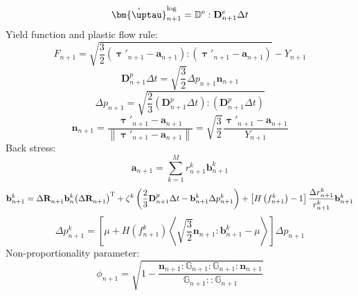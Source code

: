 \begin{equation}
\label{Equ:sigman+1}
\mathring {\bm{\uptau}}_{n + 1}^{\log } = {\mathbb{D}^{\rm{e}}}:{\mathbf{D}}_{n + 1}^e\Delta t
\end{equation}
Yield function and plastic flow rule:
\begin{equation}
\label{Equ:Fn+1}
{F_{n + 1}} = \sqrt {\frac{3}{2}\left( {{{\bm{\uptau}}'_{n + 1}} - {{\mathbf{a}}_{n + 1}}} \right):\left( {{{\bm{\uptau}}'_{n + 1}} - {{\mathbf{a}}_{n + 1}}} \right)}  - {Y_{n + 1}}
\end{equation}
\begin{equation}
\label{Equ:epsilonpn+1}
{\mathbf{D}}_{n + 1}^p\Delta t = \sqrt {\frac{3}{2}} \Delta {p_{n + 1}}{{\mathbf{n}}_{n + 1}}
\end{equation}
\begin{equation}
\label{Equ:pn+1}
\Delta {p_{n + 1}} = \sqrt {\frac{2}{3} \left({\mathbf{D}}_{n + 1}^p\Delta t\right):\left({\mathbf{D}}_{n + 1}^p\Delta t\right)}
\end{equation}
\begin{equation}
\label{Equ:nn+1}
{{\mathbf{n}}_{n + 1}} = \frac{{{{\bm{\uptau}'}_{n + 1}} - {{\mathbf{a}}_{n + 1}}}}{{\left\| {{{\bm{\uptau}'}_{n + 1}} - {{\mathbf{a}}_{n + 1}}} \right\|}} = \sqrt {\frac{3}{2}} \frac{{{{\bm{\uptau}'}_{n + 1}} - {{\mathbf{a}}_{n + 1}}}}{{{Y_{n + 1}}}}
\end{equation}
Back stress:
\begin{equation}
\label{Equ:an+1}
{{\mathbf{a}}_{n + 1}} = \sum\limits_{k = 1}^M {r_{n + 1}^k{\mathbf{b}}_{n + 1}^k}
\end{equation}
\begin{equation}
{{\mathbf{b}}_{n + 1}^k = \Delta {\mathbf{R}}_{n + 1}^{} {\mathbf{b}}_n^k {\left( {\Delta {\mathbf{R}}_{n + 1}^{}} \right)^{\rm{T}}} + {\zeta ^k}\left( {\frac{2}{3} {{\mathbf{D}}_{n + 1}^p\Delta t} - {\mathbf{b}}_{n + 1}^k\Delta p_{n + 1}^k} \right) + \left[ {H\left( {f_{n + 1}^k} \right) - 1} \right]{\frac{{\Delta r_{n + 1}^k}}{{r_{n + 1}^k}}{\mathbf{b}}_{n + 1}^k}}
\end{equation}
\begin{equation}
\Delta p_{n + 1}^k = \left[ {\mu  + H\left( {f_{n + 1}^k} \right)\left\langle {\sqrt {\frac{3}{2}} {{\mathbf{n}}_{n + 1}}:{\mathbf{b}}_{n + 1}^k - \mu } \right\rangle } \right]\Delta {p_{n + 1}}
\end{equation}
Non-proportionality parameter:
\begin{equation}
{\phi _{n + 1}} = \sqrt {1 - \frac{{{{\mathbf{n}}_{n + 1}}:{\mathbb{G}_{n + 1}}:{\mathbb{G}_{n + 1}}:{{\mathbf{n}}_{n + 1}}}}{{{\mathbb{G}_{n + 1}}::{\mathbb{G}_{n + 1}}}}}
\end{equation}

